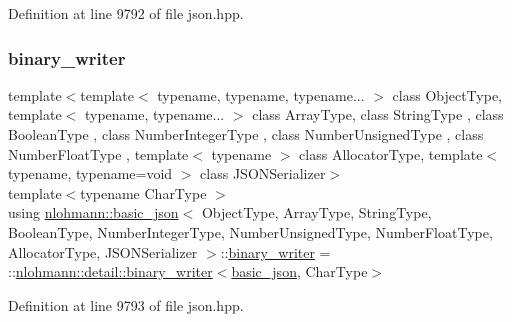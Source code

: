 Definition at line 9792 of file json.\+hpp.

\mbox{\label{classnlohmann_1_1basic__json_af32e8be561b513f946e3ca511e968d58}} 
\subsubsection{\texorpdfstring{binary\+\_\+writer}{binary\_writer}}
{\footnotesize\ttfamily template$<$template$<$ typename, typename, typename... $>$ class Object\+Type, template$<$ typename, typename... $>$ class Array\+Type, class String\+Type , class Boolean\+Type , class Number\+Integer\+Type , class Number\+Unsigned\+Type , class Number\+Float\+Type , template$<$ typename $>$ class Allocator\+Type, template$<$ typename, typename=void $>$ class J\+S\+O\+N\+Serializer$>$ \\
template$<$typename Char\+Type $>$ \\
using \hyperlink{classnlohmann_1_1basic__json}{nlohmann\+::basic\+\_\+json}$<$ Object\+Type, Array\+Type, String\+Type, Boolean\+Type, Number\+Integer\+Type, Number\+Unsigned\+Type, Number\+Float\+Type, Allocator\+Type, J\+S\+O\+N\+Serializer $>$\+::\hyperlink{classnlohmann_1_1basic__json_af32e8be561b513f946e3ca511e968d58}{binary\+\_\+writer} =  \+::\hyperlink{classnlohmann_1_1detail_1_1binary__writer}{nlohmann\+::detail\+::binary\+\_\+writer}$<$\hyperlink{classnlohmann_1_1basic__json}{basic\+\_\+json}, Char\+Type$>$\hspace{0.3cm}{\ttfamily [private]}}



Definition at line 9793 of file json.\+hpp.

\mbox{\label{classnlohmann_1_1basic__json_a4c919102a9b4fe0d588af64801436082}} 
